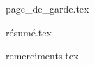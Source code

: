 {page_de_garde.tex}

\cleardoublepage
{résumé.tex}

\cleardoublepage
{remerciments.tex}

\tableofcontents